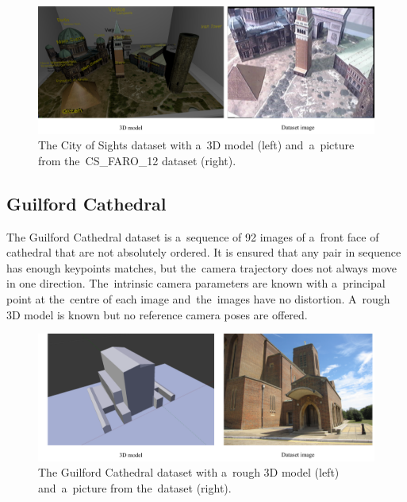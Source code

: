 \begin{figure}[ht]
	\begin{center}
		\includegraphics[keepaspectratio,width=\textwidth]{fig/experiments-city-of-sights.pdf}
	\end{center}
	\caption{The City of Sights dataset with a~3D model (left) and~a~picture from the~CS\_FARO\_12 dataset (right).}
	\label{fig:cityofsights}
\end{figure}

\subsection*{Guilford Cathedral}
The Guilford Cathedral dataset is a~sequence of 92 images of a~front face of cathedral that are not absolutely ordered. It is ensured that any pair in sequence has enough keypoints matches, but the~camera trajectory does not always move in one direction. The~intrinsic camera parameters are known with a~principal point at the~centre of each image and~the~images have no distortion. A~rough 3D model is known but no reference camera poses are offered.

\begin{figure}[ht]
	\begin{center}
		\includegraphics[keepaspectratio,width=\textwidth]{fig/experiments-cathedral.pdf}
	\end{center}
	\caption{The Guilford Cathedral dataset with a~rough 3D model (left) and~a~picture from the~dataset (right).}
	\label{fig:cathedral}
\end{figure}

